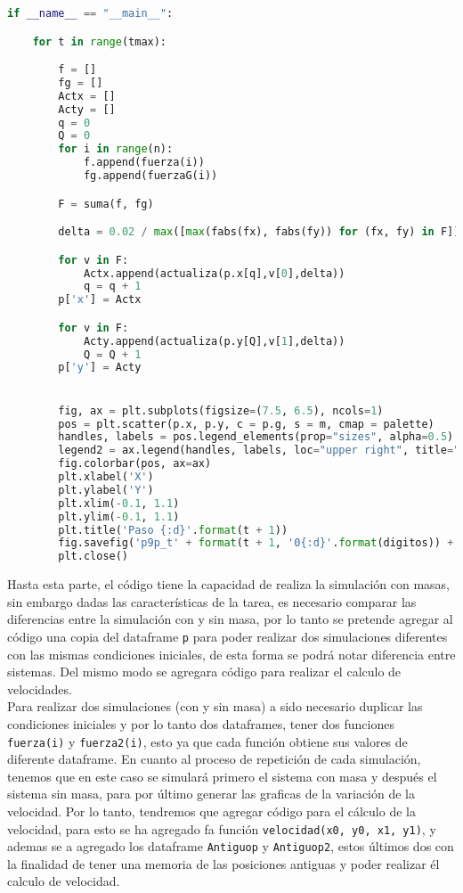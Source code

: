 \documentclass{article}
\begin{document}
  \begin{lstlisting}[language=Python]
if __name__ == "__main__":

    for t in range(tmax):

        f = []
        fg = []
        Actx = []
        Acty = []
        q = 0
        Q = 0
        for i in range(n):
            f.append(fuerza(i))
            fg.append(fuerzaG(i))

        F = suma(f, fg)

        delta = 0.02 / max([max(fabs(fx), fabs(fy)) for (fx, fy) in F])

        for v in F:
            Actx.append(actualiza(p.x[q],v[0],delta))
            q = q + 1
        p['x'] = Actx

        for v in F:
            Acty.append(actualiza(p.y[Q],v[1],delta))
            Q = Q + 1
        p['y'] = Acty


        fig, ax = plt.subplots(figsize=(7.5, 6.5), ncols=1)
        pos = plt.scatter(p.x, p.y, c = p.g, s = m, cmap = palette)
        handles, labels = pos.legend_elements(prop="sizes", alpha=0.5)
        legend2 = ax.legend(handles, labels, loc="upper right", title="Masa")
        fig.colorbar(pos, ax=ax)
        plt.xlabel('X')
        plt.ylabel('Y')
        plt.xlim(-0.1, 1.1)
        plt.ylim(-0.1, 1.1)
        plt.title('Paso {:d}'.format(t + 1))
        fig.savefig('p9p_t' + format(t + 1, '0{:d}'.format(digitos)) + '.png')
        plt.close()
 \end{lstlisting}

Hasta esta parte, el código tiene la capacidad de realiza la simulación 
con masas, sin embargo dadas las características de la tarea, es
necesario comparar las diferencias entre la simulación con y sin masa,
por lo tanto se pretende agregar al código una copia del dataframe 
\texttt{p} para poder realizar dos simulaciones diferentes con las mismas 
condiciones iniciales, de esta forma se podrá notar diferencia entre 
sistemas. Del mismo modo se agregara código para realizar el calculo de 
velocidades.\\

Para realizar dos simulaciones (con y sin masa) a sido necesario duplicar 
las condiciones iniciales y por lo tanto dos dataframes, tener dos 
funciones \texttt{fuerza(i)} y  \texttt{fuerza2(i)}, esto ya que cada función 
obtiene sus valores de diferente dataframe. En cuanto al proceso de 
repetición de cada simulación, tenemos que en este caso se simulará 
primero el sistema con masa y después el sistema sin masa, para por 
último generar las graficas de la variación de la velocidad. Por lo tanto, 
tendremos que agregar código para el cálculo de la velocidad, para esto 
se ha agregado fa función \texttt{velocidad(x0, y0, x1, y1)}, y ademas se a 
agregado los dataframe \texttt{Antiguop} y \texttt{Antiguop2}, estos 
últimos dos con la finalidad de tener una memoria de las posiciones 
antiguas y poder realizar él calculo de velocidad.\\
\end{document}
